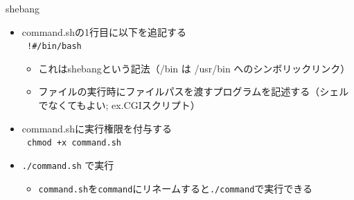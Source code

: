 \documentclass[12pt,aspectratio=169]{beamer}
\begin{document}
\begin{frame}{shebang}
  \begin{itemize}
    \item command.shの1行目に以下を追記する \\
      \texttt {
        !\#/bin/bash
      }
      \begin{itemize}
        \item これはshebangという記法（/bin は /usr/bin へのシンボリックリンク）
        \item ファイルの実行時にファイルパスを渡すプログラムを記述する（シェルでなくてもよい; ex.CGIスクリプト）
      \end{itemize}
    \item command.shに実行権限を付与する \\
      \texttt {
        chmod +x command.sh
      }
    \item \texttt{./command.sh} で実行
      \begin{itemize}
        \item \texttt{command.sh}を\texttt{command}にリネームすると\texttt{./command}で実行できる
      \end{itemize}

  \end{itemize}


\end{frame}
\end{document}
